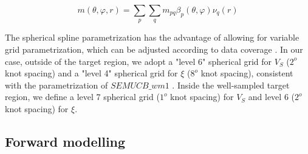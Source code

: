 \documentclass[12pt]{article}
\begin{document}
\begin{equation}
	m(\theta,\varphi,r) = \sum_{p}\sum_{q}m_{pq}\beta_{p}(\theta,\varphi)\nu_{q}(r)
\end{equation}

The spherical spline parametrization has the advantage of allowing for variable grid parametrization, which can be adjusted according to data coverage \citep[e.g.][]{marone2007three}. 
In our case, outside of the target region, we adopt a "level 6" spherical grid for $V_{S}$ ($2^{o}$ knot spacing) and a "level 4" spherical grid for $\xi$ ($8^{o}$ knot spacing), consistent with the parametrization of $SEMUCB\_wm1$ \citep{french2014whole}. 
Inside the well-sampled target region, we define a level 7 spherical grid ($1^{o}$ knot spacing) for $V_{S}$ and level 6 ($2^{o}$ knot spacing) for $\xi$. 

 \subsection{Forward modelling}
\end{document}
